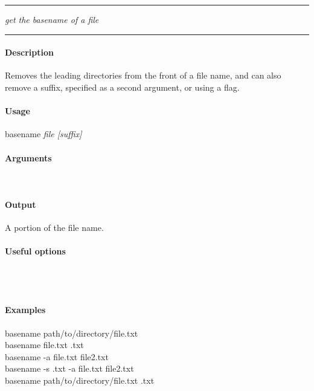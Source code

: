\hrule
\vspace{1mm}
%
    {\emph{get the basename of a file}}{}
\hrule
\vspace{4mm}

\paragraph{Description}
\indentpar \raggedright \textrm{Removes the leading directories from the front of a file name, and can also remove a suffix, specified as a second argument, or using a flag.}\\

\paragraph{Usage}
\indentpar basename \textit{file [suffix]}

\paragraph{Arguments}
\indentpar {}\\
\indentpar {}

\paragraph{Output}
\indentpar \textrm{A portion of the file name.}

\paragraph{Useful options}
\indentpar {}\\
\indentpar {}\\



\paragraph{Examples}

\indentpar basename path/to/directory/file.txt\\
\indentpar basename file.txt .txt\\
\indentpar basename -a file.txt file2.txt\\
\indentpar basename -s .txt -a file.txt file2.txt\\
\indentpar basename path/to/directory/file.txt .txt\\

\vspace{20mm}
